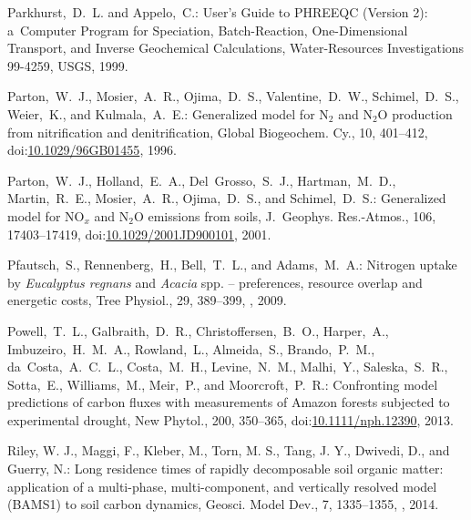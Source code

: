 \documentclass[gmd,noline]{copernicus}
\begin{document}
\begin{thebibliography}{55}
Parkhurst,~D.~L. and Appelo,~C.:
User's Guide to PHREEQC (Version 2): a~Computer Program for Speciation, Batch-Reaction, One-Dimensional Transport, and Inverse Geochemical Calculations,
Water-Resources Investigations 99-4259,
USGS,   1999.


Parton,~W.~J., Mosier,~A.~R., Ojima,~D.~S., Valentine,~D.~W., Schimel,~D.~S., Weier,~K., and Kulmala,~A.~E.:
Generalized model for N$_2$ and N$_2$O production from nitrification and denitrification,
Global Biogeochem. Cy.,
10, 401--412,
doi:\href{http://dx.doi.org/10.1029/96GB01455}{10.1029/96GB01455}, 1996.


Parton,~W.~J., Holland,~E.~A., Del~Grosso,~S.~J., Hartman,~M.~D., Martin,~R.~E., Mosier,~A.~R., Ojima,~D.~S., and Schimel,~D.~S.:
Generalized model for NO$_x$ and N$_2$O emissions from soils,
J.~Geophys. Res.-Atmos.,
106, 17403--17419,
doi:\href{http://dx.doi.org/10.1029/2001JD900101}{10.1029/2001JD900101}, 2001.


Pfautsch,~S., Rennenberg,~H., Bell,~T.~L., and Adams,~M.~A.:
Nitrogen uptake by \textit{Eucalyptus regnans} and \textit{Acacia} spp. -- preferences, resource overlap and energetic costs,
Tree Physiol.,
29, 389--399,
, 2009.


Powell,~T.~L., Galbraith,~D.~R., Christoffersen,~B.~O., Harper,~A.,
Imbuzeiro,~H.~M.~A., Rowland,~L., Almeida,~S., Brando,~P.~M.,
da~Costa,~A.~C.~L., Costa,~M.~H., Levine,~N.~M., Malhi,~Y., Saleska,~S.~R.,
Sotta,~E., Williams,~M., Meir,~P., and Moorcroft,~P.~R.: Confronting model
predictions of carbon fluxes with measurements of Amazon forests subjected to
experimental drought, New Phytol., 200, 350--365,
doi:\href{http://dx.doi.org/10.1111/nph.12390}{10.1111/nph.12390}, 2013.



Riley, W. J., Maggi, F., Kleber, M., Torn, M. S., Tang, J. Y., Dwivedi, D.,
and Guerry, N.: Long residence times of rapidly decomposable soil organic
matter: application of a multi-phase, multi-component, and vertically
resolved model (BAMS1) to soil carbon dynamics, Geosci. Model Dev., 7,
1335--1355, , 2014.






\end{thebibliography}
\end{document}
